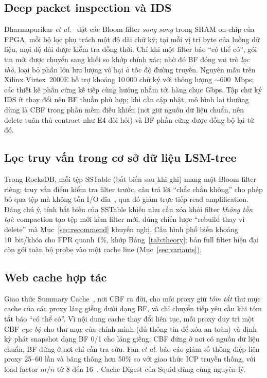 \documentclass[11pt,a4paper]{article}
\begin{document}
\subsection{Deep packet inspection và IDS}
Dharmapurikar \emph{et al.}~\cite{dpi2003} đặt các Bloom filter \emph{song
song} trong SRAM on-chip của FPGA, mỗi bộ lọc phụ trách một độ dài chữ ký;
tại mỗi vị trí byte của luồng dữ liệu, mọi độ dài được kiểm tra đồng thời.
Chỉ khi một filter báo ``có thể có'', gói tin mới được chuyển sang khối so
khớp chính xác; nhờ đó BF đóng vai trò \emph{lọc thô}, loại bỏ phần lớn lưu lượng
vô hại ở tốc độ đường truyền. Nguyên mẫu trên Xilinx Virtex~2000E hỗ trợ
khoảng 10\,000 chữ ký với thông lượng ${\sim}600$~Mbps; các thiết kế phần
cứng kế tiếp cùng hướng nhắm tới hàng chục Gbps. Tập chữ ký IDS ít thay đổi
nên BF thuần phù hợp; khi cần cập nhật, mô hình lai thường dùng là CBF trong
phần mềm điều khiển (nơi giữ nguồn dữ liệu chuẩn, nên delete tuân thủ
contract như E4 đòi hỏi) và BF phần cứng được đồng bộ lại từ đó.

\subsection{Lọc truy vấn trong cơ sở dữ liệu LSM-tree}
Trong RocksDB, mỗi tệp SSTable (bất biến sau khi ghi) mang một Bloom filter
riêng; truy vấn điểm kiểm tra filter trước, câu trả lời ``chắc chắn không''
cho phép bỏ qua tệp mà không tốn I/O đĩa~\cite{rocksdbBloom}, qua đó giảm trực
tiếp read amplification. Đáng chú ý, tính bất biến của SSTable khiến nhu cầu
xóa khỏi filter \emph{không tồn tại}: compaction tạo tệp mới kèm filter mới,
đúng chiến lược ``rebuild thay vì delete'' mà Mục~\ref{sec:recommend}
khuyến nghị. Cấu hình phổ biến khoảng 10~bit/khóa cho FPR quanh 1\%, khớp
Bảng~\ref{tab:theory}; bản full filter hiện đại còn gói toàn bộ probe vào
một cache line (Mục~\ref{sec:variants}).

\subsection{Web cache hợp tác}
Giao thức Summary Cache~\cite{fan2000}, nơi CBF ra đời, cho mỗi proxy
giữ \emph{tóm tắt} thư mục cache của các proxy láng giềng dưới dạng BF, và
chỉ chuyển tiếp yêu cầu khi tóm tắt báo ``có thể có''. Vì nội dung cache
thay đổi liên tục, mỗi proxy duy trì một CBF \emph{cục bộ} cho thư mục của
chính mình (đủ thông tin để xóa an toàn) và định kỳ phát snapshot dạng BF
0/1 cho láng giềng: CBF đứng ở nơi có nguồn dữ liệu chuẩn, BF đứng ở nơi chỉ
cần tra cứu. Fan \emph{et al.} báo cáo giảm số thông điệp liên proxy
25--60 lần và băng thông hơn 50\% so với giao thức ICP truyền thống, với
load factor $m/n$ từ 8 đến 16~\cite{fan2000}. Cache Digest của Squid dùng
cùng nguyên lý.
\end{document}
